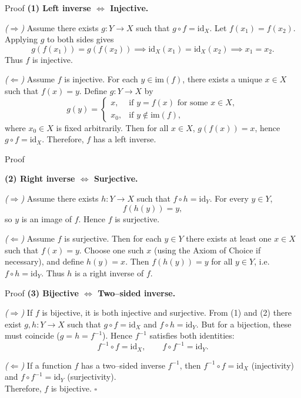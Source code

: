 \documentclass[11pt,aspectratio=43,ignorenonframetext,t]{beamer}
\begin{document}
\begin{frame}{Proof }
\textbf{(1) Left inverse $\Leftrightarrow$ Injective.}

\emph{($\Rightarrow$)}  
Assume there exists \(g:Y\to X\) such that \(g\circ f = \mathrm{id}_X.\)  
Let \(f(x_1)=f(x_2)\). Applying \(g\) to both sides gives
\[
g(f(x_1)) = g(f(x_2)) \implies \mathrm{id}_X(x_1) = \mathrm{id}_X(x_2) \implies x_1 = x_2.
\]
Thus \(f\) is injective.

\emph{($\Leftarrow$)}  
Assume \(f\) is injective.  
For each \(y\in\mathrm{im}(f)\), there exists a unique \(x\in X\) such that \(f(x)=y\).  
Define \(g:Y\to X\) by
\[
g(y) =
\begin{cases}
x, & \text{if } y=f(x)\text{ for some }x\in X,\\[4pt]
x_0, & \text{if } y\notin\mathrm{im}(f),
\end{cases}
\]
where \(x_0\in X\) is fixed arbitrarily.  
Then for all \(x\in X\), \(g(f(x))=x\), hence \(g\circ f=\mathrm{id}_X.\)  
Therefore, \(f\) has a left inverse.

\end{frame}


\begin{frame}{Proof }

\textbf{(2) Right inverse $\Leftrightarrow$ Surjective.}

\emph{($\Rightarrow$)}  
Assume there exists \(h:Y\to X\) such that \(f\circ h=\mathrm{id}_Y.\)  
For every \(y\in Y\),
\[
f(h(y)) = y,
\]
so \(y\) is an image of \(f\). Hence \(f\) is surjective.

\emph{($\Leftarrow$)}  
Assume \(f\) is surjective.  
Then for each \(y\in Y\) there exists at least one \(x\in X\) such that \(f(x)=y\).  
Choose one such \(x\) (using the Axiom of Choice if necessary), and define \(h(y)=x.\)  
Then \(f(h(y))=y\) for all \(y\in Y\), i.e. \(f\circ h=\mathrm{id}_Y.\)
Thus \(h\) is a right inverse of \(f.\)
\end{frame}

\begin{frame}{Proof }
\textbf{(3) Bijective $\Leftrightarrow$ Two–sided inverse.}

\emph{($\Rightarrow$)}  
If \(f\) is bijective, it is both injective and surjective.  
From (1) and (2) there exist \(g,h:Y\to X\) such that \(g\circ f=\mathrm{id}_X\) and \(f\circ h=\mathrm{id}_Y.\)  
But for a bijection, these must coincide (\(g=h=f^{-1}\)).  
Hence \(f^{-1}\) satisfies both identities:
\[
f^{-1}\circ f = \mathrm{id}_X,\qquad f\circ f^{-1} = \mathrm{id}_Y.
\]

\emph{($\Leftarrow$)}  
If a function \(f\) has a two–sided inverse \(f^{-1}\), then \(f^{-1}\circ f=\mathrm{id}_X\) (injectivity) and \(f\circ f^{-1}=\mathrm{id}_Y\) (surjectivity).\\ 

Therefore, \(f\) is bijective. \(\square\)
\end{frame}
\end{document}
